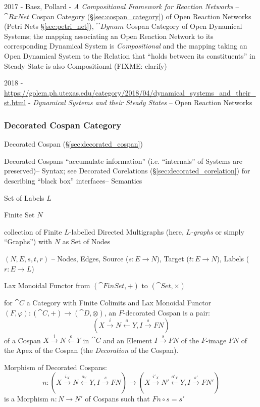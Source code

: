 2017 - Baez, Pollard - \emph{A Compositional Framework for Reaction Networks}
-- $\cat{RxNet}$ Cospan Category (\S\ref{sec:cospan_category}) of Open Reaction
Networks (Petri Nets \S\ref{sec:petri_net}), $\cat{Dynam}$ Cospan Category of
Open Dynamical Systems; the mapping associating an Open Reaction Network to its
corresponding Dynamical System is \emph{Compositional} and the mapping taking
an Open Dynamical System to the Relation that ``holds between its
constituents'' in Steady State is also Compositional (FIXME: clarify)

2018 - \url{https://golem.ph.utexas.edu/category/2018/04/dynamical_systems_and_their_st.html} -
\emph{Dynamical Systems and their Steady States} --
Open Reaction Networks



\subsubsection{Decorated Cospan Category}
\label{sec:decorated_cospan_category}

Decorated Cospan (\S\ref{sec:decorated_cospan})

Decorated Cospans ``accumulate information'' (i.e. ``internals'' of
Systems are preserved)-- Syntax; see Decorated Corelations
(\S\ref{sec:decorated_corelation}) for describing ``black box''
interfaces-- Semantics

Set of Labels $L$

Finite Set $N$

collection of Finite $L$-labelled Directed Multigraphs (here,
\emph{$L$-graphs} or simply ``Graphs'') with $N$ as Set of Nodes

$(N,E,s,t,r)$ -- Nodes, Edges, Source ($s : E \rightarrow N$), Target
($t : E \rightarrow N$), Labels ($r : E \rightarrow L$)

Lax Monoidal Functor from $(\cat{FinSet},+)$ to $(\cat{Set}, \times)$


for $\cat{C}$ a Category with Finite Colimits and Lax Monoidal Functor
$(F, \varphi) : (\cat{C}, +) \rightarrow (\cat{D}, \otimes)$, an
$F$-decorated Cospan is a pair:
\[
  (X \xrightarrow{i} N \xleftarrow{o} Y, I \xrightarrow{s} F N)
\]
of a Cospan $X \xrightarrow{i} N \xleftarrow{o} Y$ in $\cat{C}$ and an
Element $I \xrightarrow{s} F N$ of the $F$-image $F N$ of the Apex of
the Cospan (the \emph{Decoration} of the Cospan).

Morphism of Decorated Cospans:
\[
  n: (X \xrightarrow{i_X} N \xleftarrow{o_Y} Y, I \xrightarrow{s} F N)
    \rightarrow (X \xrightarrow{i'_X} N' \xleftarrow{o'_Y} Y,
      I \xrightarrow{s'} F N')
\]
is a Morphism $n : N \rightarrow N'$ of Cospans such that $F n \circ s
= s'$

